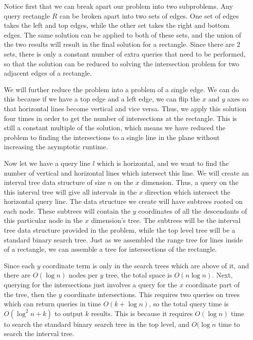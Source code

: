\documentclass[psamsfonts]{amsart}
\newenvironment{sol}{\vspace{0.25cm}{\large \bfseries Solution:}}{\qedsymbol}
\begin{document}
\begin{sol}
Notice first that we can break apart our problem into two subproblems. Any query rectangle $R$ can be broken apart into two sets of edges. One set of edges takes the left and top edges, while the other set takes the right and bottom edges. The same solution can be applied to both of these sets, and the union of the two results will result in the final solution for a rectangle. Since there are 2 sets, there is only a constant number of extra queries that need to be performed, so that the solution can be reduced to solving the intersection problem for two adjacent edges of a rectangle.

We will further reduce the problem into a problem of a single edge. We can do this because if we have a top edge and a left edge, we can flip the $x$ and $y$ axes so that horizontal lines become vertical and vice versa. Thus, we apply this solution four times in order to get the number of intersections at the rectangle. This is still a constant multiple of the solution, which means we have reduced the problem to finding the intersections to a single line in the plane without increasing the asymptotic runtime.

Now let we have a query line $l$ which is horizontal, and we want to find the number of vertical and horizontal lines which intersect this line. We will create an interval tree data structure of size $n$ on the $x$ dimension. Thus, a query on the this interval tree will give all intervals in the $x$ direction which intersect the horizontal query line. The data structure we create will have subtrees rooted on each node. These subtrees will contain the $y$ coordinates of all the descendants of this particular node in the $x$ dimension's tree. The subtrees will be the interval tree data structure provided in the problem, while the top level tree will be a standard binary search tree. Just as we assembled the range tree for lines inside of a rectangle, we can assemble a tree for intersections of the rectangle. 

Since each $y$ coordinate term is only in the search trees which are above of it, and there are $O(\log n)$ nodes per $y$ tree, the total space is $O(n \log n)$. Next, querying for the intersections just involves a query for the $x$ coordinate part of the tree, then the $y$ coordinate intersections. This requires two queries on trees which can return queries in time $O(k + \log n)$, so the total query time is $O(\log^2 n + k)$ to output $k$ results. This is because it requires $O(\log n)$ time to search the standard binary search tree in the top level, and $O(\log n$ time to search the interval tree. 
\end{sol}
\end{document}
